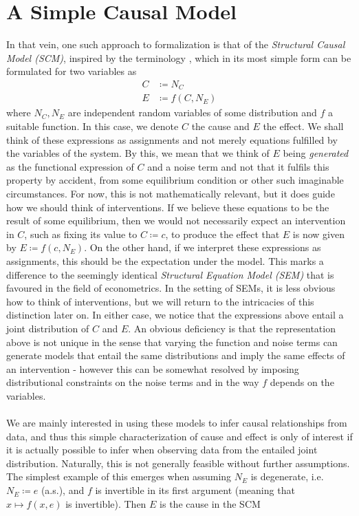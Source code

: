 \documentclass[11pt, a4paper]{memoir}
\theoremstyle{break}
\theoremstyle{break}
\theoremstyle{nonumberplain}
\begin{document}
\section{A Simple Causal Model}
In that vein, one such approach to formalization is that of the \textit{Structural Causal Model (SCM)}, inspired by the terminology \cite{Peters}, which in its most simple form can be formulated for two variables as
\begin{align*}
C&\coloneqq N_C\\
E&\coloneqq f(C,N_E)
\end{align*}
where $N_C,N_E$ are independent random variables of some distribution and $f$ a suitable function. In this case, we denote $C$ the cause and $E$ the effect. We shall think of these expressions as assignments and not merely equations fulfilled by the variables of the system. By this, we mean that we think of $E$ being \textit{generated} as the functional expression of $C$ and a noise term and not that it fulfils this property by accident, from some equilibrium condition or other such imaginable circumstances. For now, this is not mathematically relevant, but it does guide how we should think of interventions. If we believe these equations to be the result of some equilibrium, then we would not necessarily expect an intervention in $C$, such as fixing its value to $C\coloneqq c$, to produce the effect that $E$ is now given by $E\coloneqq f(c,N_E)$. On the other hand, if we interpret these expressions as assignments, this should be the expectation under the model. This marks a difference to the seemingly identical \textit{Structural Equation Model (SEM)} that is favoured in the field of econometrics. In the setting of SEMs, it is less obvious how to think of interventions, but we will return to the intricacies of this distinction later on. In either case, we notice that the expressions above entail a joint distribution of $C$ and $E$. An obvious deficiency is that the representation above is not unique in the sense that varying the function and noise terms can generate models that entail the same distributions and imply the same effects of an intervention - however this can be somewhat resolved by imposing distributional constraints on the noise terms and in the way $f$ depends on the variables.\\\\ 
We are mainly interested in using these models to infer causal relationships from data, and thus this simple characterization of cause and effect is only of interest if it is actually possible to infer when observing data from the entailed joint distribution. Naturally, this is not generally feasible without further assumptions. The simplest example of this emerges when assuming $N_E$ is degenerate, i.e. $N_E\coloneqq e$ (a.s.), and $f$ is invertible in its first argument (meaning that $x\mapsto f(x,e)$ is invertible). Then $E$ is the cause in the SCM
\end{document}
